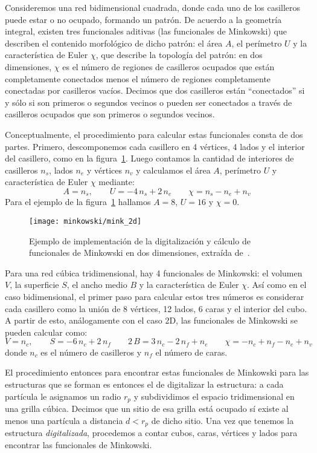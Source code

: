 Consideremos una red bidimensional cuadrada, donde cada uno de los casilleros puede estar o no ocupado, formando un patrón.
De acuerdo a la geometría integral, existen tres funcionales aditivas (las funcionales de Minkowski) que describen el contenido morfológico de dicho patrón: el área $A$, el perímetro $U$ y la característica de Euler $\chi$, que describe la topología del patrón: en dos dimensiones, $\chi$ es el número de regiones de casilleros ocupados que están completamente conectados menos el número de regiones completamente conectadas por casilleros vacíos. Decimos que dos casilleros están ``conectados'' si y sólo si son primeros o segundos vecinos o pueden ser conectados a través de casilleros ocupados que son primeros o segundos vecinos.

Conceptualmente, el procedimiento para calcular estas funcionales consta de dos partes. Primero, descomponemos cada casillero en 4 vértices, 4 lados y el interior del casillero, como en la figura~\ref{fig:mink_2d}. Luego contamos la cantidad de interiores de casilleros $n_s$, lados $n_e$ y vértices $n_v$ y calculamos el área $A$, perímetro $U$ y característica de Euler $\chi$ mediante:
\begin{equation}
A = n_s, \qquad U = -4\,n_s + 2\,n_e \qquad \chi = n_s - n_e + n_v
\end{equation}
Para el ejemplo de la figura~\ref{fig:mink_2d} hallamos $A = 8$, $U = 16$ y $\chi = 0$.

\begin{figure}[h] %
\centering
\texttt{[image: minkowski/mink\_2d]}
\caption{Ejemplo de implementación de la digitalización y cálculo de funcionales de Minkowski en dos dimensiones, extraída de~\cite{michielsen_integral-geometry_2001}.}
\label{fig:mink_2d}
\end{figure}


Para una red cúbica tridimensional, hay 4 funcionales de Minkowski: el volumen $V$, la superficie $S$, el ancho medio $B$ y la característica de Euler $\chi$.
Así como en el caso bidimensional, el primer paso para calcular estos tres números es considerar cada casillero como la unión de 8 vértices, 12 lados, 6 caras y el interior del cubo.
A partir de esto, análogamente con el caso 2D, las funcionales de Minkowski se pueden calcular como:
\begin{equation}
V = n_c, \qquad S = -6\,n_c + 2\,n_f \qquad 2\,B = 3\,n_c - 2\,n_f + n_e \qquad \chi = -n_c + n_f - n_e + n_v
\end{equation}
donde $n_c$ es el número de casilleros y $n_f$ el número de caras.

El procedimiento entonces para encontrar estas funcionales de Minkowski para las estructuras que se forman es entonces el de digitalizar la estructura: a cada partícula le asignamos un radio $r_p$ y subdividimos el espacio tridimensional en una grilla cúbica.
Decimos que un sitio de esa grilla está ocupado sí existe al menos una partícula a distancia $d<r_p$ de dicho sitio.
Una vez que tenemos la estructura \emph{digitalizada}, procedemos a contar cubos, caras, vértices y lados para encontrar las funcionales de Minkowski.